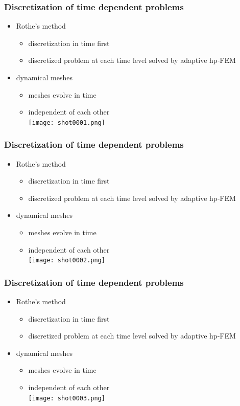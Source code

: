 \documentclass{beamer}
\begin{document}
\begin{frame}
\frametitle{Discretization of time dependent problems}
\begin{itemize}
\item Rothe's method\ \\
\begin{itemize}
\item discretization in time first
\item discretized problem at each time level solved by adaptive hp-FEM
\end{itemize}
\item dynamical meshes
\begin{itemize}
\item meshes evolve in time
\item independent of each other
\\
\texttt{[image: shot0001.png]}
\end{itemize}
\end{itemize}
\end{frame}
\begin{frame}
\frametitle{Discretization of time dependent problems}
\begin{itemize}
\item Rothe's method\ \\
\begin{itemize}
\item discretization in time first
\item discretized problem at each time level solved by adaptive hp-FEM
\end{itemize}
\item dynamical meshes
\begin{itemize}
\item meshes evolve in time
\item independent of each other
\\
\texttt{[image: shot0002.png]}
\end{itemize}
\end{itemize}
\end{frame}
\begin{frame}
\frametitle{Discretization of time dependent problems}
\begin{itemize}
\item Rothe's method\ \\
\begin{itemize}
\item discretization in time first
\item discretized problem at each time level solved by adaptive hp-FEM
\end{itemize}
\item dynamical meshes
\begin{itemize}
\item meshes evolve in time
\item independent of each other
\\
\texttt{[image: shot0003.png]}
\end{itemize}
\end{itemize}
\end{frame}
\end{document}
